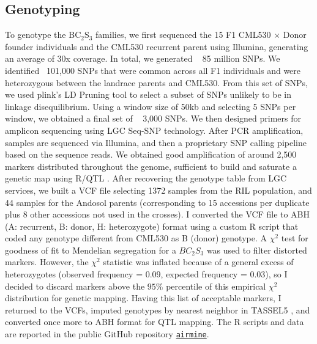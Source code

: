 \subsection{Genotyping}
 To genotype the BC$_2$S$_3$ families, we first sequenced the 15 F1 CML530 $\times$ Donor founder individuals and the CML530 recurrent parent using Illumina, generating an average of 30x coverage. In total, we generated ~ 85 million SNPs.
 We identified ~101,000 SNPs that were common across all F1 individuals and were heterozygous between the landrace parents and CML530. From this set of SNPs, we used plink's LD Pruning tool to select a subset of SNPs unlikely to be in linkage disequilibrium. Using a window size of 50kb and selecting 5 SNPs per window,  we obtained a final set of ~ 3,000 SNPs.
 We then designed primers for amplicon sequencing using LGC Seq-SNP technology. 
 After PCR amplification, samples are sequenced via Illumina, and then a proprietary SNP calling pipeline based on the sequence reads.
 We obtained good amplification of around 2,500 markers distributed throughout the genome, sufficient to build and saturate a genetic map using R/QTL \citep{broman2012}.
 After recovering the genotype table from LGC services, we built a VCF file selecting 1372 samples from the RIL population, and 44 samples for the Andosol parents (corresponding to 15 accessions per duplicate plus 8 other accessions not used in the crosses).
I converted the VCF file to ABH (A: recurrent, B: donor, H: heterozygote) format using a custom R script that coded any genotype different from CML530 as B (donor) genotype.
A $\chi^2$ test for goodness of fit to Mendelian segregation for a $BC_2S_3$ was used to filter distorted markers. 
However, the $\chi^2$ statistic was inflated because of a general excess of heterozygotes (observed frequency = 0.09, expected frequency = 0.03), so I decided to discard markers above the $95\%$ percentile of this empirical $\chi^2$ distribution for genetic mapping. 
Having this list of acceptable markers, I returned to the VCFs, imputed genotypes by nearest neighbor in TASSEL5 \citep{bradbury2007}, and converted once more to ABH format for QTL mapping.
The R scripts and data are reported in the public GitHub repository  \href{https://github.com/sawers-rellan-labs/airmine}{\texttt{airmine}}.


